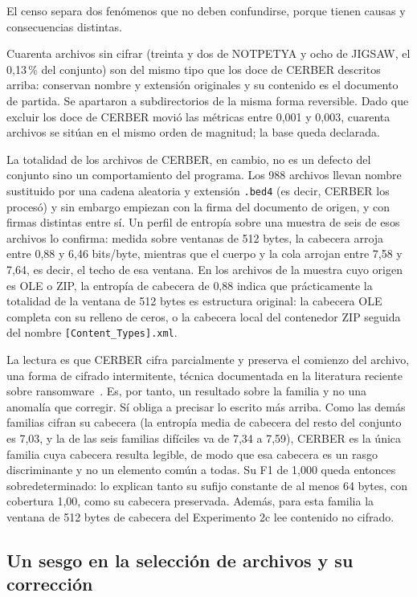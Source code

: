 El censo separa dos fenómenos que no deben confundirse, porque tienen causas y consecuencias distintas.

Cuarenta archivos sin cifrar (treinta y dos de NOTPETYA y ocho de JIGSAW, el 0,13\,\% del conjunto) son del mismo tipo que los doce de CERBER descritos arriba: conservan nombre y extensión originales y su contenido es el documento de partida. Se apartaron a subdirectorios de la misma forma reversible. Dado que excluir los doce de CERBER movió las métricas entre 0,001 y 0,003, cuarenta archivos se sitúan en el mismo orden de magnitud; la base queda declarada.

La totalidad de los archivos de CERBER, en cambio, no es un defecto del conjunto sino un comportamiento del programa. Los 988 archivos llevan nombre sustituido por una cadena aleatoria y extensión \texttt{.bed4} (es decir, CERBER los procesó) y sin embargo empiezan con la firma del documento de origen, y con firmas distintas entre sí. Un perfil de entropía sobre una muestra de seis de esos archivos lo confirma: medida sobre ventanas de 512 bytes, la cabecera arroja entre 0,88 y 6,46 bits/byte, mientras que el cuerpo y la cola arrojan entre 7,58 y 7,64, es decir, el techo de esa ventana. En los archivos de la muestra cuyo origen es OLE o ZIP, la entropía de cabecera de 0,88 indica que prácticamente la totalidad de la ventana de 512 bytes es estructura original: la cabecera OLE completa con su relleno de ceros, o la cabecera local del contenedor ZIP seguida del nombre \texttt{[Content\_Types].xml}.

La lectura es que CERBER cifra parcialmente y preserva el comienzo del archivo, una forma de cifrado intermitente, técnica documentada en la literatura reciente sobre ransomware~\cite{ineza2025intermittent}. Es, por tanto, un resultado sobre la familia y no una anomalía que corregir. Sí obliga a precisar lo escrito más arriba. Como las demás familias cifran su cabecera (la entropía media de cabecera del resto del conjunto es 7,03, y la de las seis familias difíciles va de 7,34 a 7,59), CERBER es la única familia cuya cabecera resulta legible, de modo que esa cabecera es un rasgo discriminante y no un elemento común a todas. Su F1 de 1,000 queda entonces sobredeterminado: lo explican tanto su sufijo constante de al menos 64 bytes, con cobertura 1,00, como su cabecera preservada. Además, para esta familia la ventana de 512 bytes de cabecera del Experimento 2c lee contenido no cifrado.

\subsection{Un sesgo en la selección de archivos y su corrección}
\label{subsec:exp2c_sesgo_pdf}

